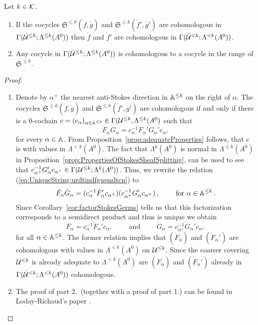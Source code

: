 \begin{lem}
  Let $k\in\mathcal{K}$.
  \begin{enumerate}
    \item If the cocycles $\mathfrak{S}^{\leq k}(\dot f,\dot g)$ and
      $\mathfrak{S}^{\leq k}(\dot f',\dot g')$ are cohomologous in
      $\Gamma(\dot{\mathcal{U}}^{\leq k};\Lambda^{\leq k}(A^0))$
      then $\dot f$ and $\dot f'$ are cohomologous in
      $\Gamma(\dot{\mathcal{U}}^{<k};\Lambda^{<k}(A^0))$.
    \item Any cocycle in $\Gamma(\dot{\mathcal{U}}^{\leq k};\Lambda^{\leq k}(A^0))$ is
      cohomologous to a cocycle in the range of $\mathfrak{S}^{\leq k}$.
  \end{enumerate}
\end{lem}
\begin{proof}
  \begin{enumerate}
    \item Denote by $\alpha^+$ the nearest anti-Stokes direction in
      $\mathbb{A}^{\leq k}$ on the right of $\alpha$.
      The cocycles $\mathfrak{S}^{\leq k}(\dot f,\dot g)$ and
      $\mathfrak{S}^{\leq k}(\dot f',\dot g')$ are cohomologous if and only
      if there is a $0$-cochain $c=(c_\alpha)_{\alpha\in\mathbb{A}^{\leq k}}
      \in\Gamma(\mathcal{U}^{\leq k},\Lambda^{\leq k}(A^0)$ such that
      \begin{equation}\label{eq:UniqueString:urdtindfgupndtcn}
        \dot F_\alpha\dot G_\alpha =
        c_\alpha^{-1}\dot F_\alpha'\dot G_\alpha'c_{\alpha^+}
      \end{equation}
      for every $\alpha\in\mathbb{A}$. From Proposition~\ref{prop:adequateProperties}
      follows, that $c$ is with values in $\Lambda^{<k}(A^0)$.
      The fact that $\Lambda^k(A^0)$ is normal in $\Lambda^{\leq k}(A^0)$ in
      Proposition~\ref{prop:PropertiesOfStokesSheafSplitting}, can be used to
      see that $ c_{\alpha^+}^{-1}G_\alpha'c_{\alpha^+}
      \in\Gamma(\mathcal{U}^{\leq k};\Lambda^{k}(A^0))$.
      Thus, we rewrite the relation (\ref{eq:UniqueString:urdtindfgupndtcn}) to
      \[
        \dot F_\alpha\dot G_\alpha =
        (c_\alpha^{-1}\dot F_\alpha'c_{\alpha^+})
        (c_{\alpha^+}^{-1}G_\alpha'c_{\alpha^+})
        \,,\qquad\text{~for~} \alpha\in\mathbb{A}^{\leq k} \,.
      \]
      Since Corollary~\ref{cor:factorStokesGerms} tells us that this
      factorization corresponds to a semidirect product and thus is unique we
      obtain
      \[
        \dot F_\alpha=c_\alpha^{-1}\dot F_\alpha'c_{\alpha^+}
        \qquad \text{~and~} \qquad
        \dot G_\alpha=c_{\alpha^+}^{-1}\dot G_\alpha'c_{\alpha^+}
      \]
      for all $\alpha\in\mathbb{A}^{\leq k}$.
      The former relation implies that $(\dot F_\alpha)$ and $(\dot F_\alpha')$
      are cohomologous with values in $\Lambda^{<k}(A^0)$ on $\mathcal{U}^{\leq k}$.
      Since the coarser covering $\mathcal{U}^{<k}$ is already adequate to
      $\Lambda^{<k}(A^0)$ are $(\dot F_\alpha)$ and $(\dot F_\alpha')$ already
      in $\Gamma(\dot{\mathcal{U}}^{<k};\Lambda^{<k}(A^0))$ cohomologous.
    \item The proof of part 2.\ (together with a proof of part 1.) can be
      found in Loday-Richaud's paper \cite[Proof of Lem.II.3.3]{Loday1994}.
  \end{enumerate}
\end{proof}
